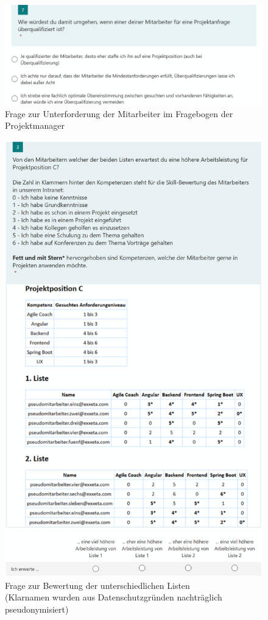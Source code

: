 \begin{figure}[h]
	\centering
	\includegraphics[width=1\textwidth]{gfx/umfrage-projektmanager-unterforderung.png}
	\caption{Frage zur Unterforderung der Mitarbeiter im Fragebogen der Projektmanager}
	\label{fig:methodik:evaluation:manager:abb3}
\end{figure}

\begin{figure}[h]
\centering
\includegraphics[width=1\textwidth]{gfx/projekt-c-liste-pseudonym.png}
\caption[Frage zur Bewertung der unterschiedlichen Listen]{Frage zur Bewertung der unterschiedlichen Listen\\
	(Klarnamen wurden aus Datenschutzgründen nachträglich pseudonymisiert)}
\label{fig:methodik:evaluation:manager:abb1}
\end{figure}

